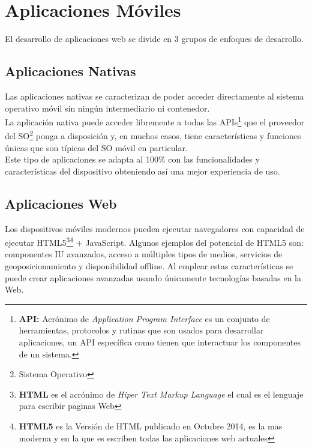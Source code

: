 \section{Aplicaciones Móviles}
\label{sec:aplicaciones_moviles}

  El desarrollo de aplicaciones web se divide en 3 grupos de enfoques de desarrollo.\\

  \subsection{Aplicaciones Nativas}
  \label{sub:aplicaciones_nativas}

  Las aplicaciones nativas se caracterizan de poder acceder directamente al sistema operativo móvil sin ningún intermediario ni contenedor.\\

  La aplicación nativa puede acceder libremente a todas las APIs\footnote{\textbf{API:} Acrónimo de \emph{Application Program Interface} es un conjunto de herramientas, protocolos y rutinas que son usados para desarrollar aplicaciones, un API específica como tienen que interactuar los componentes de un sistema.} que el proveedor del SO\footnote{Sistema Operativo} ponga a disposición y, en muchos casos, tiene características y funciones únicas que son típicas del SO móvil en particular.\\

  Este tipo de aplicaciones se adapta al 100\% con las funcionalidades y características del dispositivo obteniendo así una mejor experiencia de uso.\\


  \subsection{Aplicaciones Web}
  \label{sub:aplicaciones_web}

  Los dispositivos móviles modernos pueden ejecutar navegadores con capacidad de ejecutar HTML5\footnote{\textbf{HTML} es el acrónimo de \emph{Hiper Text Markup Language} el cual es el lenguaje para escribir paginas Web}\footnote{\textbf{HTML5} es la Versión de HTML publicado en Octubre 2014, es la mas moderna y en la que es escriben todas las aplicaciones web actuales} + JavaScript. Algunos ejemplos del potencial de HTML5 son: componentes IU avanzados, acceso a múltiples tipos de medios, servicios de geoposicionamiento y disponibilidad offline. Al emplear estas características se puede crear aplicaciones avanzadas usando únicamente tecnologías basadas en la Web.\\

